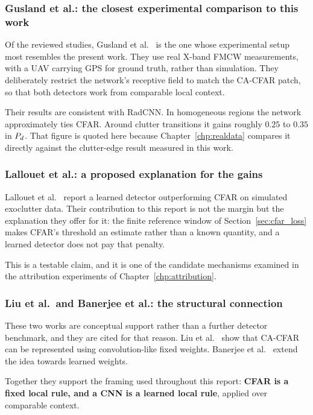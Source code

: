 \subsubsection*{Gusland et al.: the closest experimental comparison to this work}

Of the reviewed studies, Gusland et al.~\cite{gusland2020deeptemporal} is the one whose experimental
setup most resembles the present work. They use real X-band FMCW measurements, with a UAV carrying
GPS for ground truth, rather than simulation. They deliberately restrict the network's receptive
field to match the CA-CFAR patch, so that both detectors work from comparable local context.

Their results are consistent with RadCNN. In homogeneous regions the network approximately ties
CFAR. Around clutter transitions it gains roughly $0.25$ to $0.35$ in $P_{d}$. That figure is quoted
here because Chapter~\ref{chp:realdata} compares it directly against the clutter-edge result
measured in this work.

\subsubsection*{Lallouet et al.: a proposed explanation for the gains}

Lallouet et al.~\cite{lallouet2023loss} report a learned detector outperforming CFAR on simulated
exoclutter data. Their contribution to this report is not the margin but the explanation they offer
for it: the finite reference window of Section~\ref{sec:cfar_loss} makes CFAR's threshold an
estimate rather than a known quantity, and a learned detector does not pay that penalty.

This is a testable claim, and it is one of the candidate mechanisms examined in the attribution
experiments of Chapter~\ref{chp:attribution}.

\subsubsection*{Liu et al.\ and Banerjee et al.: the structural connection}

These two works are conceptual support rather than a further detector benchmark, and they are cited
for that reason. Liu et al.~\cite{liu2024cacfarconv} show that CA-CFAR can be represented using
convolution-like fixed weights. Banerjee et al.~\cite{banerjee2025rctd} extend the idea towards
learned weights.

Together they support the framing used throughout this report: \textbf{CFAR is a fixed local rule,
and a CNN is a learned local rule}, applied over comparable context.

